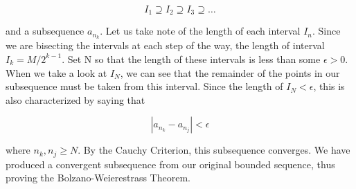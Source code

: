 \documentclass{article}
\begin{document}
\begin{equation}
    I_1 \supseteq I_2 \supseteq I_3 \supseteq \ldots
\end{equation}

and a subsequence $a_{n_k}$. Let us take note of the length of each interval $I_n$. Since we are bisecting the intervals at each step of the way, the length of interval $I_k = M/2^{k-1}$. Set N so that the length of these intervals is less than some $\epsilon > 0$. When we take a look at $I_N$, we can see that the remainder of the points in our subsequence must be taken from this interval. Since the length of $I_N < \epsilon$, this is also characterized by saying that 

\begin{equation}
    | a_{n_k}-a_{n_j} | < \epsilon
\end{equation}

where $n_k, n_j \geq N$. By the Cauchy Criterion, this subsequence converges. We have produced a convergent subsequence from our original bounded sequence, thus proving the Bolzano-Weierestrass Theorem. 
\end{document}

